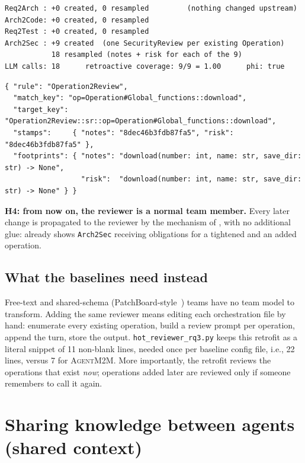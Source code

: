 \documentclass[10pt,a4paper]{article}
\newcommand{\tool}{\textsc{AgentM2M}}
\newcommand{\TL}{\mathit{TL}}
\newcommand{\code}[1]{\texttt{#1}}
\newcommand{\file}[1]{\texttt{#1}}
\theoremstyle{definition}
\newcommand{\what}[1]{\par\smallskip\noindent\textbf{#1}\quad}
\begin{document}
\begin{lstlisting}[style=engine, caption={First run after the HOT.}]
Req2Arch : +0 created, 0 resampled         (nothing changed upstream)
Arch2Code: +0 created, 0 resampled
Req2Test : +0 created, 0 resampled
Arch2Sec : +9 created  (one SecurityReview per existing Operation)
           18 resampled (notes + risk for each of the 9)
LLM calls: 18      retroactive coverage: 9/9 = 1.00      phi: true
\end{lstlisting}

\begin{lstlisting}[style=engine, caption={Resulting trace link in $\TL_{\code{Arch2Sec}}$.}]
{ "rule": "Operation2Review",
  "match_key": "op=Operation#Global_functions::download",
  "target_key": "Operation2Review::sr::op=Operation#Global_functions::download",
  "stamps":     { "notes": "8dec46b3fdb87fa5", "risk": "8dec46b3fdb87fa5" },
  "footprints": { "notes": "download(number: int, name: str, save_dir: str) -> None",
                  "risk":  "download(number: int, name: str, save_dir: str) -> None" } }
\end{lstlisting}

\what{H4: from now on, the reviewer is a normal team member.} Every later
change is propagated to the reviewer by the mechanism of
, with no additional glue:  already
shows \code{Arch2Sec} receiving obligations for a tightened and an added
operation.

\subsection{What the baselines need instead}

Free-text and shared-schema (PatchBoard-style~\cite{zhang2026patchboard})
teams have no team model to transform. Adding the
same reviewer means editing each orchestration file by hand: enumerate every
existing operation, build a review prompt per operation, append the turn,
store the output. \file{hot_reviewer_rq3.py} keeps this retrofit as a
literal snippet of 11 non-blank lines, needed once per baseline config file,
i.e., 22 lines, versus 7 for \tool{}. More importantly, the retrofit reviews
the operations that exist \emph{now}; operations added later are reviewed
only if someone remembers to call it again.

\section{Sharing knowledge between agents (shared context)}\label{sec:context}
\end{document}
